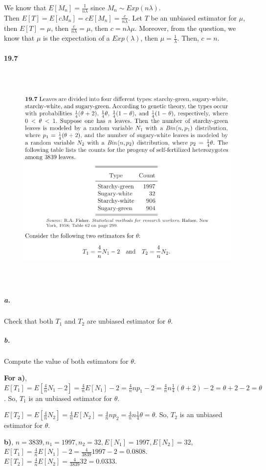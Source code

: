 \documentclass{article} %
\begin{document}
We know that $E[M_n] = \frac{1}{n\lambda}$ since $M_n \sim Exp(n\lambda)$. \\
Then $E[T] = E[cM_n] = cE[M_n] = \frac{c}{n\lambda}$. Let $T$ be an unbiased estimator for $\mu$, then $E[T] = \mu$, then $\frac{c}{n\lambda}=\mu$, then $c= n \lambda \mu$. Moreover, from the question, we know that $\mu$ is the expectation of a $Exp(\lambda)$, then $\mu = \frac{1}{\lambda}$. Then, $c = n$. 

\paragraph*{19.7}
\begin{figure}[h!]
\centering
\includegraphics[width=5.5in, height=4.5in]{4.png}
\end{figure}
\subparagraph*{a.} Check that both $T_1$ and $T_2$ are unbiased estimator for $\theta$. 
\subparagraph*{b.} Compute the value of both estimators for $\theta$. 

{\bf For a)}, $E[T_1] = E[\frac{4}{n}N_1 - 2] = \frac{4}{n}E[N_1] - 2 = \frac{4}{n} np_1 - 2 = \frac{4}{n}n\frac{1}{4}(\theta + 2) - 2 = \theta + 2 - 2 = \theta$. So, $T_1$ is an unbiased estimator for $\theta$. 

$E[T_2] = E[\frac{4}{n}N_2]=\frac{4}{n}E[N_2] = \frac{4}{n}np_2 = \frac{4}{n}n\frac{1}{4}\theta = \theta$. So, $T_2$ is an unbiased estimator for $\theta$. 

{\bf b)}, $n = 3839, n_1 = 1997, n_2 = 32, E[N_1] = 1997, E[N_2] = 32$,
$E[T_1] = \frac{4}{n}E[N_1] - 2 = \frac{4}{3839}1997  - 2 = 0.0808$. \\
$E[T_2] = \frac{4}{n}E[N_2] = \frac{4}{3839}32 = 0.0333$.
\end{document}
